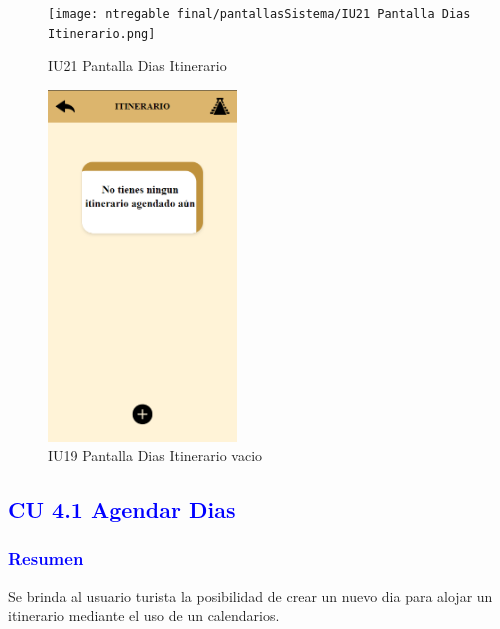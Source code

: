 \begin{figure}[htbp]
        \centering
        \texttt{[image: ntregable final/pantallasSistema/IU21 Pantalla Dias Itinerario.png]}
    \caption{IU21 Pantalla Dias Itinerario}
        \label{fig:enter-label}
\end{figure}

\begin{figure}[htbp]
        \centering
        \includegraphics[width= 5cm]{entregable final/pantallasSistema/IU19 Pantalla Dias Itinerario vacio.png}
    \caption{IU19 Pantalla Dias Itinerario vacio}
        \label{fig:enter-label}
        \vspace{200pt}
\end{figure}
\newpage


\pagebreak
\subsection{\textcolor{blue}{CU 4.1 Agendar Dias}}

\subsubsection{\textcolor{blue}{Resumen}}
Se brinda al usuario turista la posibilidad de crear un nuevo dia para alojar un itinerario mediante el uso de un calendarios.

